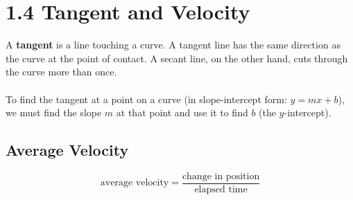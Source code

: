 %
%

\section*{1.4 Tangent and Velocity} 

A \textbf{tangent} is a line touching a curve. A tangent line has the same direction as the curve at the point of contact. A secant line, on the other hand, cuts through the curve more than once.
\\\\
To find the tangent at a point on a curve (in slope-intercept form: \(y=mx+b\)), we must find the slope \(m\) at that point and use it to find \(b\) (the \(y\)-intercept). 

\subsection*{Average Velocity}

$$\text{average velocity} = \frac{\text{change in position}}{\text{elapsed time}}$$ 

